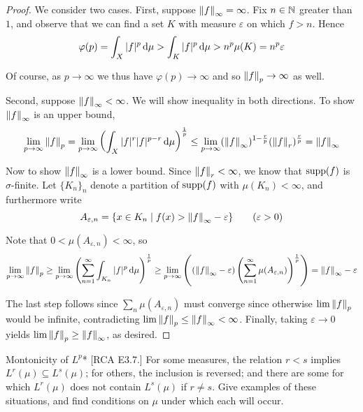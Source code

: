 \begin{proof}
     We consider two cases. First, suppose \(\norm{f}_\infty = \infty\). Fix \(n \in \mathbb{N}\) greater than \(1\), and observe that we can find a set \(K\) with measure \(\varepsilon\) on which \(f > n\). Hence
    \[
        \varphi(p) = \int_X |f|^p \, \mathrm{d}\mu > \int_K |f|^p \, \mathrm{d}\mu > n^p \mu(K) = n^p \varepsilon
    \]
    
    Of course, as \(p \to \infty\) we thus have \(\varphi(p) \to \infty\) and so \(\norm{f}_p \to \infty\) as well. 
    \stdvspace

    Second, suppose \(\norm{f}_\infty < \infty\). We will show inequality in both directions. To show \(\norm{f}_\infty\) is an upper bound, 
    \[
        \lim_{p \to \infty} \norm{f}_p = \lim_{p \to \infty} \left( \int_X |f|^r |f|^{p-r} \, \mathrm{d}\mu \right)^{\frac{1}{p}} 
        \leq \lim_{p \to \infty} (\norm{f}_\infty)^{1 - \frac{r}{p}} (\norm{f}_r)^{\frac{r}{p}}
        = \norm{f}_\infty
    \]

    Now to show \(\norm{f}_\infty\) is a lower bound. Since \(\norm{f}_r < \infty\), we know that \(\operatorname{supp}(f)\) is \(\sigma\)-finite. Let \(\{K_n\}_n\) denote a partition of \(\operatorname{supp}(f)\) with \(\mu(K_n) < \infty\), and furthermore write 
    \[
        A_{\varepsilon, n} = \{x \in K_n \mid f(x) > \norm{f}_\infty - \varepsilon\}
        \qquad (\varepsilon > 0)
    \]

    Note that \(0 < \mu(A_{\varepsilon, n}) < \infty\), so 
    \[
        \lim_{p \to \infty} \norm{f}_p 
        \geq \lim_{p \to \infty} \left( \sum_{n=1}^\infty \int_{K_n} |f|^p \, \mathrm{d}\mu \right)^{\frac{1}{p}} 
        \geq \lim_{p \to \infty} \left( (\norm{f}_\infty - \varepsilon) \left( \sum_{n=1}^\infty \mu(A_{\varepsilon, n}) \right)^{\frac{1}{p}} \right)
        = \norm{f}_\infty - \varepsilon
    \]

    The last step follows since \(\sum_n \mu(A_{\varepsilon, n})\) must converge since otherwise \(\lim \norm{f}_p\) would be infinite, contradicting \(\lim \norm{f}_p \leq \norm{f}_\infty < \infty\). Finally, taking \(\varepsilon \to 0\) yields \(\lim \norm{f}_p \geq \norm{f}_\infty\), as desired. 
\end{proof}

\begin{problem}{Montonicity of \(L^p\)}*
    [RCA E3.7.] For some measures, the relation \(r < s\) implies \(L^r(\mu) \subseteq L^s(\mu)\); for others, the inclusion is reversed; and there are some for which \(L^r(\mu)\) does not contain \(L^s(\mu)\) if \(r \neq s\). Give examples of these situations, and find conditions on \(\mu\) under which each will occur. 
\end{problem}

